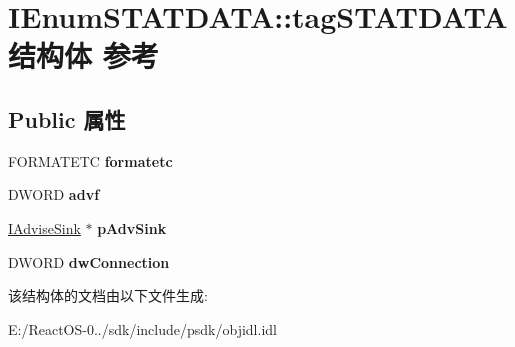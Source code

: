 \hypertarget{struct_i_enum_s_t_a_t_d_a_t_a_1_1tag_s_t_a_t_d_a_t_a}{}\section{I\+Enum\+S\+T\+A\+T\+D\+A\+TA\+:\+:tag\+S\+T\+A\+T\+D\+A\+T\+A结构体 参考}
\label{struct_i_enum_s_t_a_t_d_a_t_a_1_1tag_s_t_a_t_d_a_t_a}
\subsection*{Public 属性}
\begin{DoxyCompactItemize}
\item 
\mbox{\label{struct_i_enum_s_t_a_t_d_a_t_a_1_1tag_s_t_a_t_d_a_t_a_a204b03a614def0671eef2deb91319c5b}} 
F\+O\+R\+M\+A\+T\+E\+TC {\bfseries formatetc}
\item 
\mbox{\label{struct_i_enum_s_t_a_t_d_a_t_a_1_1tag_s_t_a_t_d_a_t_a_a14b3b860fcc2403d81c7d7215b0fa456}} 
D\+W\+O\+RD {\bfseries advf}
\item 
\mbox{\label{struct_i_enum_s_t_a_t_d_a_t_a_1_1tag_s_t_a_t_d_a_t_a_a261cef92fa6a91d1cc013ed02c64c2e3}} 
\hyperlink{interface_i_advise_sink}{I\+Advise\+Sink} $\ast$ {\bfseries p\+Adv\+Sink}
\item 
\mbox{\label{struct_i_enum_s_t_a_t_d_a_t_a_1_1tag_s_t_a_t_d_a_t_a_ae856f2c32965e6c121fae976bd34e6ed}} 
D\+W\+O\+RD {\bfseries dw\+Connection}
\end{DoxyCompactItemize}


该结构体的文档由以下文件生成\+:\begin{DoxyCompactItemize}
\item 
E\+:/\+React\+O\+S-\/0../sdk/include/psdk/objidl.\+idl\end{DoxyCompactItemize}
